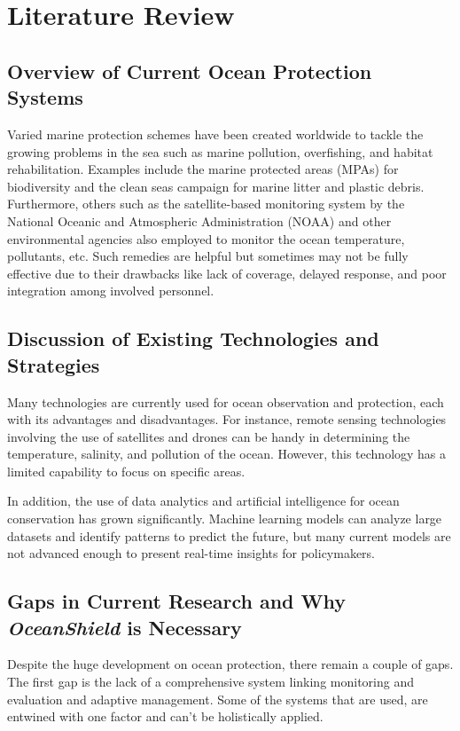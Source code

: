 \documentclass[a4paper]{article}
\begin{document}
\section{Literature Review}

\subsection{Overview of Current Ocean Protection Systems }

Varied marine protection schemes have been created worldwide to tackle the growing problems in the sea such as marine pollution, overfishing, and habitat rehabilitation. Examples include the marine protected areas (MPAs) for biodiversity and the clean seas campaign for marine litter and plastic debris. Furthermore, others such as the satellite-based monitoring system by the National Oceanic and Atmospheric Administration (NOAA) and other environmental agencies also employed to monitor the ocean temperature, pollutants, etc. Such remedies are helpful but sometimes may not be fully effective due to their drawbacks like lack of coverage, delayed response, and poor integration among involved personnel. 

\subsection{Discussion of Existing Technologies and Strategies}

Many technologies are currently used for ocean observation and protection, each with its advantages and disadvantages. For instance, remote sensing technologies involving the use of satellites and drones can be handy in determining the temperature, salinity, and pollution of the ocean. However, this technology has a limited capability to focus on specific areas. 

In addition, the use of data analytics and artificial intelligence for ocean conservation has grown significantly. Machine learning models can analyze large datasets and identify patterns to predict the future, but many current models are not advanced enough to present real-time insights for policymakers.

\subsection{Gaps in Current Research and Why \textit{OceanShield} is Necessary }

Despite the huge development on ocean protection, there remain a couple of gaps. The first gap is the lack of a comprehensive system linking monitoring and evaluation and adaptive management. Some of the systems that are used, are entwined with one factor and can’t be holistically applied.
\end{document}
